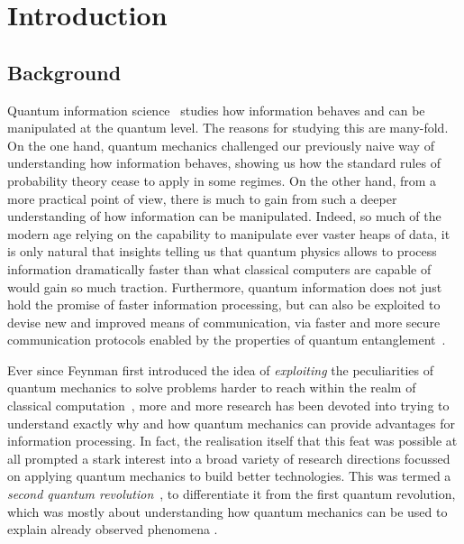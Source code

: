 
\chapter{Introduction}
\label{chapter:introduction}

\section{Background}

Quantum information science~\cite{nielsen2006quantum,watrous2018theory} studies how information behaves and can be manipulated at the quantum level.
The reasons for studying this are many-fold. On the one hand, quantum mechanics challenged our previously naive way of understanding how information behaves, showing us how the standard rules of probability theory cease to apply in some regimes.
On the other hand, from a more practical point of view, there is much to gain from such a deeper understanding of how information can be manipulated. Indeed, so much of the modern age relying on the capability to manipulate ever vaster heaps of data, it is only natural that insights telling us that quantum physics allows to process information dramatically faster than what classical computers are capable of would gain so much traction.
Furthermore, quantum information does not just hold the promise of faster information processing, but can also be exploited to devise new and improved means of communication, via faster and more secure communication protocols enabled by the properties of quantum entanglement~\cite{gisin2002quantum,krenn2016quantum,pirandola2019advances}.

Ever since Feynman first introduced the idea of \emph{exploiting} the peculiarities of quantum mechanics to solve problems harder to reach within the realm of classical computation~\cite{feynman1982simulating}, more and more research has been devoted into trying to understand exactly why and how quantum mechanics can provide advantages for information processing.
In fact, the realisation itself that this feat was possible at all prompted a stark interest into a broad variety of research directions focussed on applying quantum mechanics to build better technologies. This was termed a \textit{second quantum revolution}~\cite{dowling2003quantum}, to differentiate it from the first quantum revolution, which was mostly about understanding how quantum mechanics can be used to explain already observed phenomena .

